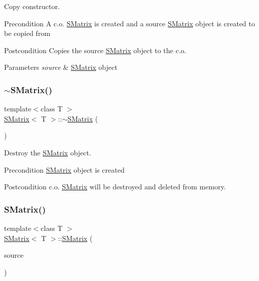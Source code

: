 Copy constructor. 

\begin{DoxyPrecond}{Precondition}
A c.\+o. \mbox{\hyperlink{class_s_matrix}{S\+Matrix}} is created and a source \mbox{\hyperlink{class_s_matrix}{S\+Matrix}} object is created to be copied from 
\end{DoxyPrecond}
\begin{DoxyPostcond}{Postcondition}
Copies the source \mbox{\hyperlink{class_s_matrix}{S\+Matrix}} object to the c.\+o. 
\end{DoxyPostcond}

\begin{DoxyParams}{Parameters}
{\em source} & \mbox{\hyperlink{class_s_matrix}{S\+Matrix}} object \\
\hline
\end{DoxyParams}
\mbox{\label{class_s_matrix_ae1222698c5e1e4b64665beb90c33f172}} 
\subsubsection{\texorpdfstring{$\sim$SMatrix()}{~SMatrix()}}
{\footnotesize\ttfamily template$<$class T $>$ \\
\mbox{\hyperlink{class_s_matrix}{S\+Matrix}}$<$ T $>$\+::$\sim$\mbox{\hyperlink{class_s_matrix}{S\+Matrix}} (\begin{DoxyParamCaption}{ }\end{DoxyParamCaption})}



Destroy the \mbox{\hyperlink{class_s_matrix}{S\+Matrix}} object. 

\begin{DoxyPrecond}{Precondition}
\mbox{\hyperlink{class_s_matrix}{S\+Matrix}} object is created 
\end{DoxyPrecond}
\begin{DoxyPostcond}{Postcondition}
c.\+o. \mbox{\hyperlink{class_s_matrix}{S\+Matrix}} will be destroyed and deleted from memory. 
\end{DoxyPostcond}
\mbox{\label{class_s_matrix_a8aa760083252567bae8433e2cae31f1b}} 
\subsubsection{\texorpdfstring{SMatrix()}{SMatrix()}\hspace{0.1cm}{\footnotesize\ttfamily [4/4]}}
{\footnotesize\ttfamily template$<$class T $>$ \\
\mbox{\hyperlink{class_s_matrix}{S\+Matrix}}$<$ T $>$\+::\mbox{\hyperlink{class_s_matrix}{S\+Matrix}} (\begin{DoxyParamCaption}\item[{\mbox{\hyperlink{class_s_matrix}{S\+Matrix}}$<$ T $>$ \&\&}]{source }\end{DoxyParamCaption})}




